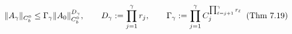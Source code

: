 \documentclass[preview]{standalone}
\begin{document}
\begin{align*}
\special{dvisvgm:raw <g id='unique000'>}\|A_\gamma\|_{C_b^0} \le \Gamma_\gamma \|A_0\|_{C_b^0}^{D_\gamma}, \qquad D_\gamma := \prod_{j=1}^\gamma r_j, \qquad \Gamma_\gamma := \prod_{j=1}^\gamma C_j^{\prod_{\ell=j+1}^\gamma r_\ell}\;\;(\text{Thm 7.19})\special{dvisvgm:raw </g>}
\end{align*}
\end{document}

